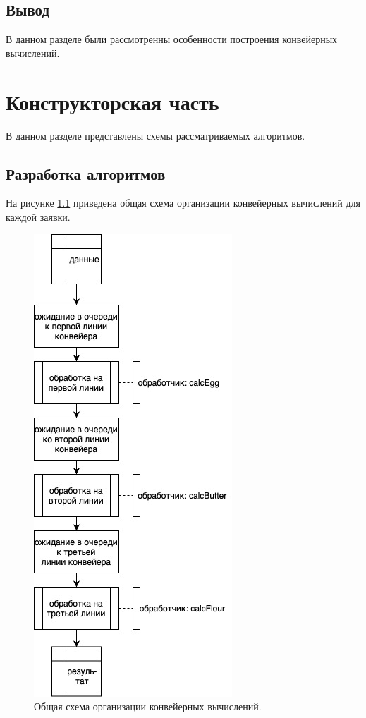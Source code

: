 \documentclass[12pt]{report}
\begin{document}
\section*{Вывод}
В данном разделе были рассмотренны особенности построения конвейерных вычислений.

\chapter{Конструкторская часть}

В данном разделе представлены схемы рассматриваемых алгоритмов.

\section{Разработка алгоритмов}

На рисунке \ref{fig:com} приведена общая схема организации конвейерных вычислений для каждой заявки. 

\begin{figure}[h]
	\centering
	\includegraphics[scale = 0.6]{common.jpg}
	\caption{Общая схема организации конвейерных вычислений.}
	\label{fig:com}
\end{figure}
\newpage
\end{document}
